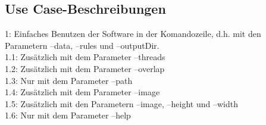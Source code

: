 \subsection{Use Case-Beschreibungen}
1: Einfaches Benutzen der Software in der Komandozeile, d.h. mit den Parametern --data, --rules und --outputDir.\\
1.1: Zusätzlich mit dem Parameter --threads\\
1.2: Zusätzlich mit dem Parameter --overlap\\
1.3: Nur mit dem Parameter --path\\
1.4: Zusätzlich mit dem Parameter --image\\
1.5: Zusätzlich mit den Parametern --image, --height und --width\\
1.6: Nur mit dem Parameter --help\\


